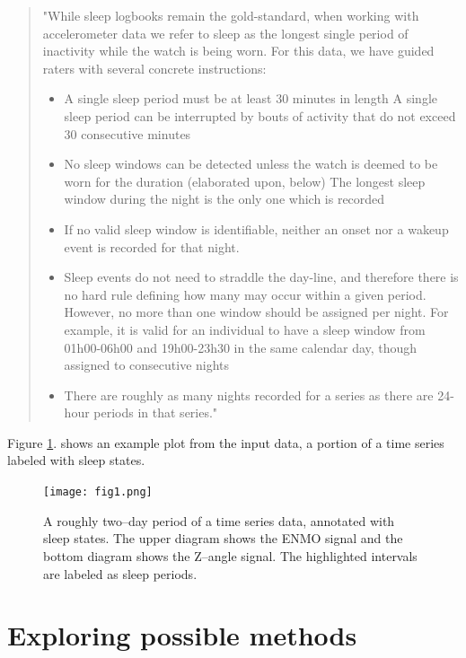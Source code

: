 \documentclass{article}
\begin{document}
\begin{quote}
"While sleep logbooks remain the gold-standard, when working with accelerometer data we refer to sleep as the longest single period of inactivity while the watch is being worn. For this data, we have guided raters with several concrete instructions:
\begin{itemize}
  \item A single sleep period must be at least 30 minutes in length
    A single sleep period can be interrupted by bouts of activity that do not exceed 30 consecutive minutes
  \item No sleep windows can be detected unless the watch is deemed to be worn for the duration (elaborated upon, below)
The longest sleep window during the night is the only one which is recorded
  \item If no valid sleep window is identifiable, neither an onset nor a wakeup event is recorded for that night.
  \item Sleep events do not need to straddle the day-line, and therefore there is no hard rule defining how many may occur within a given period. However, no more than one window should be assigned per night. For example, it is valid for an individual to have a sleep window from 01h00-06h00 and 19h00-23h30 in the same calendar day, though assigned to consecutive nights
  \item There are roughly as many nights recorded for a series as there are 24-hour periods in that series."
\end{itemize}
\end{quote}

Figure \ref{fig:data-example}. shows an example plot from the input data, a portion of a time series labeled with sleep states.

\begin{figure}
  \label{fig:data-example}
  \centering
  \texttt{[image: fig1.png]}
  \caption{A roughly two–day period of a time series data, annotated with sleep states. The upper diagram shows the ENMO signal and the bottom diagram shows the Z–angle signal. The highlighted intervals are labeled as sleep periods.}
\end{figure}

\section{Exploring possible methods}
\end{document}

